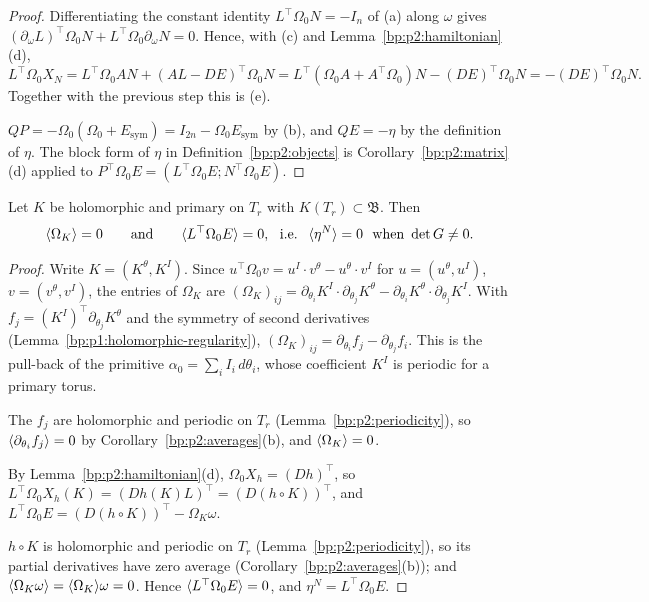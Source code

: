 \begin{proof}
\label{step:p2:fi-22}
Differentiating the constant identity $L^\top\Omega_0N=-I_n$ of (a) along $\omega$ gives
$(\partial_\omega L)^\top\Omega_0N+L^\top\Omega_0\partial_\omega N=0$. Hence, with (c) and
Lemma~\ref{bp:p2:hamiltonian}(d),
\[
L^\top\Omega_0X_N=L^\top\Omega_0AN+(AL-DE)^\top\Omega_0N=L^\top(\Omega_0A+A^\top\Omega_0)N-(DE)^\top
\Omega_0N=-(DE)^\top\Omega_0N.
\]
Together with the previous step this is (e).

\label{step:p2:fi-q}
$QP=-\Omega_0(\Omega_0+E_{\mathrm{sym}})=I_{2n}-\Omega_0E_{\mathrm{sym}}$ by (b), and $QE=-\eta$ by the
definition of $\eta$. The block form of $\eta$ in Definition~\ref{bp:p2:objects} is
Corollary~\ref{bp:p2:matrix}(d) applied to $P^\top\Omega_0E=(L^\top\Omega_0E;N^\top\Omega_0E)$.
\end{proof}

\begin{lemma}\label{bp:p2:exactness}
Let $K$ be holomorphic and primary on $T_r$ with $K(T_r)\subset\mathfrak B$. Then
\[
\avg{\Omega_K}=0\qquad\text{and}\qquad\avg{L^\top\Omega_0E}=0,\ \text{ i.e. }\ \avg{\eta^N}=0
\ \text{ when }\det G\ne0.
\]
\end{lemma}

\begin{proof}
\label{step:p2:ex-curl}
Write $K=(K^\theta,K^I)$. Since $u^\top\Omega_0v=u^I\cdot v^\theta-u^\theta\cdot v^I$ for
$u=(u^\theta,u^I)$, $v=(v^\theta,v^I)$, the entries of $\Omega_K$ are
$(\Omega_K)_{ij}=\partial_{\theta_i}K^I\cdot\partial_{\theta_j}K^\theta-\partial_{\theta_i}K^\theta\cdot
\partial_{\theta_j}K^I$. With $f_j=(K^I)^\top\partial_{\theta_j}K^\theta$ and the symmetry of second
derivatives (Lemma~\ref{bp:p1:holomorphic-regularity}), $(\Omega_K)_{ij}=\partial_{\theta_i}f_j-\partial_{\theta_j}f_i$. This is the pull-back of
the primitive $\alpha_0=\sum_iI_i\,d\theta_i$, whose coefficient $K^I$ is periodic for a primary torus.

\label{step:p2:ex-avg-omega}
The $f_j$ are holomorphic and periodic on $T_r$ (Lemma~\ref{bp:p2:periodicity}), so
$\langle \partial_{\theta_i}f_j\rangle=0$ by Corollary~\ref{bp:p2:averages}(b), and $\langle \Omega_K\rangle=0$.

\label{step:p2:ex-gradient}
By Lemma~\ref{bp:p2:hamiltonian}(d), $\Omega_0X_h=(Dh)^\top$, so
$L^\top\Omega_0X_h(K)=(Dh(K)L)^\top=(D(h\circ K))^\top$, and
$L^\top\Omega_0E=(D(h\circ K))^\top-\Omega_K\omega$.

\label{step:p2:ex-avg-eta}
$h\circ K$ is holomorphic and periodic on $T_r$ (Lemma~\ref{bp:p2:periodicity}), so its partial
derivatives have zero average (Corollary~\ref{bp:p2:averages}(b)); and $\langle \Omega_K\omega\rangle=\langle \Omega_K\rangle
\omega=0$. Hence $\langle L^\top\Omega_0E\rangle=0$, and $\eta^N=L^\top\Omega_0E$.
\end{proof}

